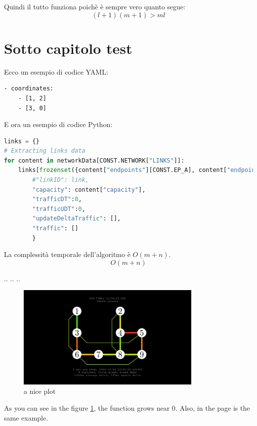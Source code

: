 \documentclass[binding=0.6cm]{sapthesis}
\begin{document}
Quindi il tutto funziona poichè è sempre vero quanto segue:
\begin{equation}
(l+1)(m+1)>ml
\end{equation}

\section{Sotto capitolo test}

Ecco un esempio di codice YAML:

\begin{lstlisting}
- coordinates:
    - [1, 2]
    - [3, 0]
\end{lstlisting}

E ora un esempio di codice Python:

\begin{lstlisting}[language=Python]
links = {}
# Extracting links data
for content in networkData[CONST.NETWORK["LINKS"]]:
    links[frozenset({content["endpoints"][CONST.EP_A], content["endpoints"][CONST.EP_B]})] = {
        #"linkID": link,
        "capacity": content["capacity"], 
        "trafficDT":0, 
        "trafficUDT":0, 
        "updateDeltaTraffic": [], 
        "traffic": []
        }
\end{lstlisting}
La complessità temporale dell'algoritmo è $O(m+n)$.
\begin{equation}
    O(m+n)
\end{equation}

.. .. ..
\begin{figure}[h]
    \centering
    \includegraphics[width=0.8\textwidth]{immagini/only_links.JPG}
    \caption{a nice plot}
    \label{fig:only_links}
\end{figure}

As you can see in the figure \ref{fig:only_links}, the 
function grows near 0. Also, in the page \pageref{fig:only_links} 
is the same example.


\printbibliography

\backmatter
\cleardoublepage
{} %
\end{document}
